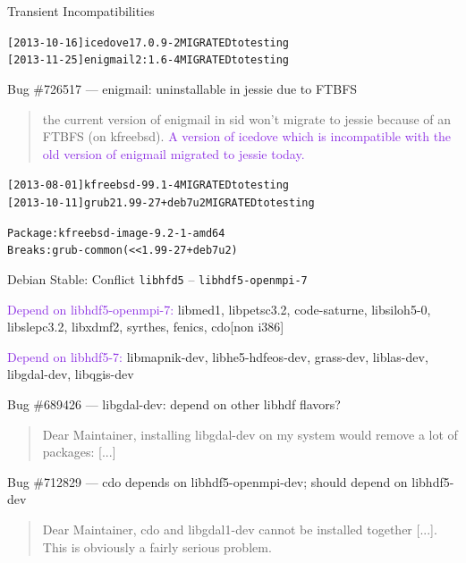 \documentclass[xcolor={dvipsnames}]{beamer}
\newcommand{\EEE}[1]{\textcolor{BlueViolet}{#1}}
\begin{document}
\begin{frame}[fragile]{Transient Incompatibilities}

\begin{alltt}
[2013-10-16] icedove 17.0.9-2 MIGRATED to testing
[2013-11-25] enigmail 2:1.6-4 MIGRATED to testing
\end{alltt}

Bug \#726517 ---  enigmail: uninstallable in jessie due to FTBFS
\begin{quote}
the current version of enigmail in sid won’t migrate to jessie
because of an FTBFS (on kfreebsd). \EEE{A version of icedove which
is incompatible with the old version of enigmail migrated to
jessie today.}
\end{quote}

\vspace{0.5em}

\begin{alltt}
[2013-08-01] kfreebsd-9 9.1-4 MIGRATED to testing
[2013-10-11] grub2 1.99-27+deb7u2 MIGRATED to testing
\end{alltt}

\begin{alltt}
Package: kfreebsd-image-9.2-1-amd64
Breaks: grub-common (<< 1.99-27+deb7u2)
\end{alltt}

\end{frame}

\begin{frame}{Debian Stable: Conflict \texttt{libhfd5} -- \texttt{libhdf5-openmpi-7}}

\EEE{Depend on libhdf5-openmpi-7:} libmed1, libpetsc3.2, code-saturne,
libsiloh5-0, libslepc3.2, libxdmf2, syrthes, fenics, cdo[non i386]

\vspace{0.5em}

\EEE{Depend on libhdf5-7:} libmapnik-dev, libhe5-hdfeos-dev,
grass-dev, liblas-dev, libgdal-dev, libqgis-dev

\vspace{2em}

Bug \#689426 --- libgdal-dev: depend on other libhdf flavors?
\begin{quote}
Dear Maintainer, 
installing libgdal-dev on my system would remove a lot of packages: [...]
\end{quote}
Bug \#712829 --- cdo depends on libhdf5-openmpi-dev; should depend on libhdf5-dev
\begin{quote}
Dear Maintainer,
cdo and libgdal1-dev cannot be installed together [...].
This is obviously a fairly serious
problem.
\end{quote}

\end{frame}
\end{document}
